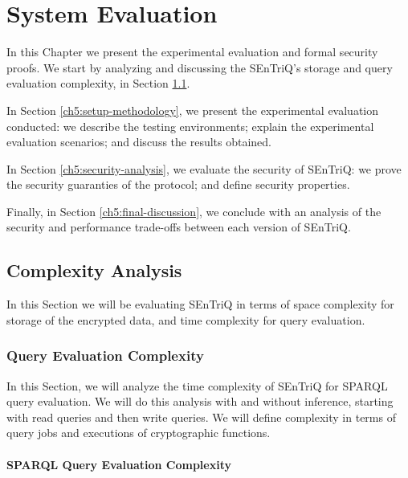 
\chapter{System Evaluation}
\label{cha:evaluation}


In this Chapter we present the experimental evaluation and formal security proofs. We start by analyzing and discussing the \gls{SEnTriQ}'s storage and query evaluation complexity, in Section \ref{ch5:complexity-analysis}. 

In Section \ref{ch5:setup-methodology}, we present the experimental evaluation conducted: we describe the testing environments; explain the experimental evaluation scenarios; and discuss the results obtained. 

In Section \ref{ch5:security-analysis}, we evaluate the security of \gls{SEnTriQ}: we prove the security guaranties of the protocol; and define  security properties. 

Finally, in Section \ref{ch5:final-discussion}, we conclude with an analysis of the security and performance trade-offs between each version of \gls{SEnTriQ}.

\section{Complexity Analysis}
\label{ch5:complexity-analysis}

In this Section we will be evaluating \gls{SEnTriQ} in terms of space complexity for storage of the encrypted data, and time complexity for query evaluation.

\subsection{Query Evaluation Complexity}

In this Section, we will analyze the time complexity of \gls{SEnTriQ} for \gls{SPARQL} query evaluation. We will do this analysis with and without inference, starting with read queries and then write queries. We will define complexity in terms of query jobs and executions of cryptographic functions.

\subsubsection{SPARQL Query Evaluation Complexity}

